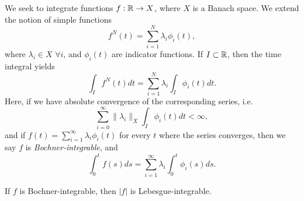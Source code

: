 \begin{definition}\label{def:bochner-integral}
    We seek to integrate functions $f:\mathbb{R}\to X$, where $X$ is a Banach space. We extend the notion of simple functions
    \begin{equation*}
        f^N(t) = \sum_{i=1}^N \lambda_i \phi_i(t),
    \end{equation*}
    where $\lambda_i \in X$ $\forall i$, and $\phi_i(t)$ are indicator functions. If $I\subset \mathbb{R}$, then the time integral yields
    \begin{equation*}
        \int_I f^N(t) dt = \sum_{i=1}^N \lambda_i \int_I \phi_i(t) dt.
    \end{equation*}
    Here, if we have absolute convergence of the corresponding series, i.e. 
    \begin{equation*}
        \sum_{i=0}^{\infty} \|\lambda_i\|_X \int_I \phi_i(t)dt <\infty,
    \end{equation*}
    and if $f(t) = \sum_{i=1}^{\infty} \lambda_i \phi_i(t)$ for every $t$ where the series converges, then we say $f$ is \emph{Bochner-integrable}, and
    \begin{equation*}
        \int_0^t f(s)ds = \sum_{i=1}^\infty \lambda_i \int_0^t \phi_i(s)ds.
    \end{equation*}    
\end{definition}
\begin{corollary}
    If $f$ is Bochner-integrable, then $|f|$ is Lebesgue-integrable. 
\end{corollary}


